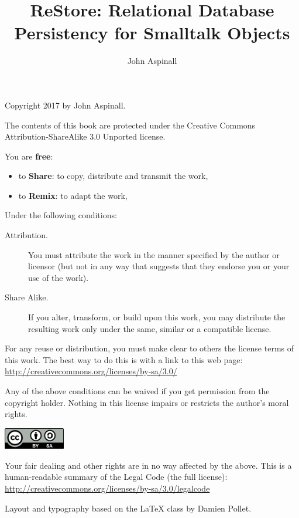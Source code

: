 \documentclass[10pt,twoside,english]{_support/latex/sbabook/sbabook}
\title{ReStore: Relational Database Persistency for Smalltalk Objects}
\author{John Aspinall}
\begin{document}
\maketitle
\pagestyle{titlingpage}
\thispagestyle{titlingpage} %

\cleartoverso
{\small

  Copyright 2017 by John Aspinall.

  The contents of this book are protected under the Creative Commons
  Attribution-ShareAlike 3.0 Unported license.

  You are \textbf{free}:
  \begin{itemize}
  \item to \textbf{Share}: to copy, distribute and transmit the work,
  \item to \textbf{Remix}: to adapt the work,
  \end{itemize}

  Under the following conditions:
  \begin{description}
  \item[Attribution.] You must attribute the work in the manner specified by the
    author or licensor (but not in any way that suggests that they endorse you
    or your use of the work).
  \item[Share Alike.] If you alter, transform, or build upon this work, you may
    distribute the resulting work only under the same, similar or a compatible
    license.
  \end{description}

  For any reuse or distribution, you must make clear to others the
  license terms of this work. The best way to do this is with a link to
  this web page: \\
  \url{http://creativecommons.org/licenses/by-sa/3.0/}

  Any of the above conditions can be waived if you get permission from
  the copyright holder. Nothing in this license impairs or restricts the
  author's moral rights.

  \begin{center}
    \includegraphics[width=0.2\textwidth]{_support/latex/sbabook/CreativeCommons-BY-SA.pdf}
  \end{center}

  Your fair dealing and other rights are in no way affected by the
  above. This is a human-readable summary of the Legal Code (the full
  license): \\
  \url{http://creativecommons.org/licenses/by-sa/3.0/legalcode}

  \vfill

  Layout and typography based on the  \LaTeX{} class by Damien
  Pollet.
}
\end{document}
